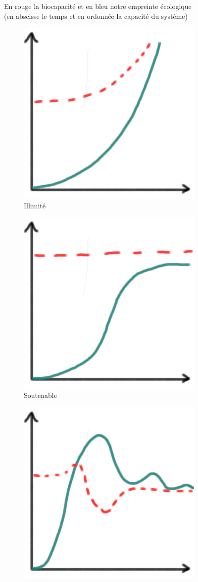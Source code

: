 \documentclass[../thesis.tex]{subfiles}
\begin{document}
    
    \vfill
    \begin{figure}[H]
        \centering
        \scriptsize En rouge la biocapacité et en bleu notre empreinte écologique \\ (en abscisse le temps et en ordonnée la capacité du système) \\
        \begin{subfigure}{.2\textwidth}
            \centering
            \includegraphics[width=0.5\linewidth]{img/intro/imaginaire-1}
            \caption{Illimité}
        \end{subfigure}
        \begin{subfigure}{.2\textwidth}
            \centering
            \includegraphics[width=0.5\linewidth]{img/intro/imaginaire-2}
            \caption{Soutenable}
        \end{subfigure}
        \begin{subfigure}{.2\textwidth}
            \centering
            \includegraphics[width=0.5\linewidth]{img/intro/imaginaire-3}

\end{subfigure}
\end{figure}
\end{document}
